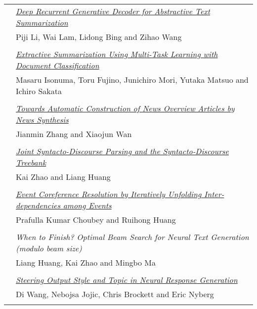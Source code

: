 \begin{tabular}{p{20mm}p{128mm}}
 & \hyperlink{page.2080}{\em Deep Recurrent Generative Decoder for Abstractive Text Summarization}\\
         & Piji Li, Wai Lam, Lidong Bing and Zihao Wang \\
\\

 & \hyperlink{page.2090}{\em Extractive Summarization Using Multi-Task Learning with Document Classification}\\
         & Masaru Isonuma, Toru Fujino, Junichiro Mori, Yutaka Matsuo and Ichiro Sakata \\
\\

 & \hyperlink{page.2100}{\em Towards Automatic Construction of News Overview Articles by News Synthesis}\\
         & Jianmin Zhang and Xiaojun Wan \\
\\

 & \hyperlink{page.2106}{\em Joint Syntacto-Discourse Parsing and the Syntacto-Discourse Treebank}\\
         & Kai Zhao and Liang Huang \\
\\

 & \hyperlink{page.2113}{\em Event Coreference Resolution by Iteratively Unfolding Inter-dependencies among Events}\\
         & Prafulla Kumar Choubey and Ruihong Huang \\
\\

 & {\em When to Finish? Optimal Beam Search for Neural Text Generation (modulo beam size)}\\
         & Liang Huang, Kai Zhao and Mingbo Ma \\
\\

 & \hyperlink{page.2123}{\em Steering Output Style and Topic in Neural Response Generation}\\
         & Di Wang, Nebojsa Jojic, Chris Brockett and Eric Nyberg \\
\\

\end{tabular}
\newpage
